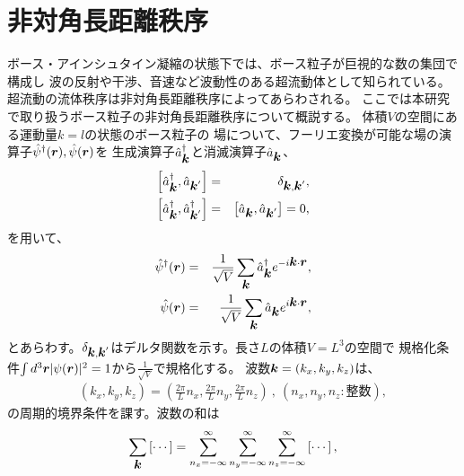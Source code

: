 \documentclass[12pt,a4paper]{jbook}
\def\Vec#1{\mbox{\boldmath $#1$}}			%
\begin{document}
		\section{非対角長距離秩序}
        	ボース・アインシュタイン凝縮の状態下では、ボース粒子が巨視的な数の集団で構成し
        	波の反射や干渉、音速など波動性のある超流動体として知られている。
        	超流動の流体秩序は非対角長距離秩序によってあらわされる。
        	ここでは本研究で取り扱うボース粒子の非対角長距離秩序について概説する。
        	体積$V$の空間にある運動量$k=l$の状態のボース粒子の
        	場について、フーリエ変換が可能な場の演算子$\hat{\psi}^\dagger(\Vec{r}),\hat{\psi}(\Vec{r})$を
        	生成演算子$\hat{a}^\dagger_{\Vec{k}}$と消滅演算子$\hat{a}_{\Vec{k}}$、
        	\begin{eqnarray}
            		\left[ \hat{a}^\dagger_{\Vec{k}}, \hat{a}_{\Vec{k}^\prime} \right] & = & 
            		\delta_{\Vec{k},\Vec{k}^\prime},
            		\\
            		\left[ \hat{a}^\dagger_{\Vec{k}}, \hat{a}^\dagger_{\Vec{k}^\prime} \right] & = & 
            		\left[ \hat{a}_{\Vec{k}}, \hat{a}_{\Vec{k}^\prime} \right] = 0,
        	\end{eqnarray}
        	を用いて、
        \begin{eqnarray}
            \label{qe:cre_ann}
            \hat{\psi}^\dagger(\Vec{r}) & = & \frac{1}{\sqrt{V}} \sum_{\Vec{k}} \hat{a}^\dagger_{\Vec{k}} e^{-i \Vec{k} \cdot \Vec{r}},
            \\
            \hat{\psi}(\Vec{r}) & = & \frac{1}{\sqrt{V}} \sum_{\Vec{k}} \hat{a}_{\Vec{k}} e^{i \Vec{k} \cdot \Vec{r}},
        \end{eqnarray}
        とあらわす。$\delta_{\Vec{k},\Vec{k}^\prime}$はデルタ関数を示す。長さ$L$の体積$V=L^3$の空間で
        規格化条件$\int d^3 \Vec{r} | \psi(\Vec{r})|^2 = 1$から$\frac{1}{\sqrt{V}}$で規格化する。
        波数$\Vec{k}=(k_x, k_y, k_z)$は、
        \begin{eqnarray}
            (k_x, k_y, k_z) = \left(
                \frac{2 \pi}{L}n_x, \frac{2 \pi}{L}n_y, \frac{2 \pi}{L}n_z
            \right)
            \ , \
            (n_x, n_y, n_z : 整数),
        \end{eqnarray}
        の周期的境界条件を課す。波数の和は
        \begin{eqnarray}
            \sum_{\Vec{k}} \left[ \cdots \right] 
            = \sum^{\infty}_{n_x = -\infty} \sum^{\infty}_{n_y = -\infty} \sum^{\infty}_{n_z = -\infty} \left[ \cdots \right],
        \end{eqnarray}
\end{document}
